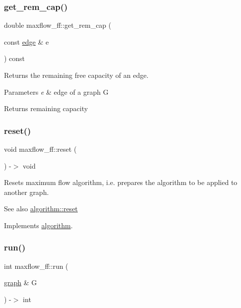 \subsubsection{\texorpdfstring{get\+\_\+rem\+\_\+cap()}{get\_rem\_cap()}}
{\footnotesize\ttfamily double maxflow\+\_\+ff\+::get\+\_\+rem\+\_\+cap (\begin{DoxyParamCaption}\item[{const \mbox{\hyperlink{classedge}{edge}} \&}]{e }\end{DoxyParamCaption}) const}

Returns the remaining free capacity of an edge.


\begin{DoxyParams}{Parameters}
{\em e} & edge of a graph G \\
\hline
\end{DoxyParams}
\begin{DoxyReturn}{Returns}
remaining capacity 
\end{DoxyReturn}
\mbox{\label{classmaxflow__ff_ab9fcde7ee97a160c2be797d35c2a3204}} 
\subsubsection{\texorpdfstring{reset()}{reset()}}
{\footnotesize\ttfamily void maxflow\+\_\+ff\+::reset (\begin{DoxyParamCaption}{ }\end{DoxyParamCaption}) -\/$>$ void\hspace{0.3cm}{\ttfamily [virtual]}}

Resets maximum flow algorithm, i.\+e. prepares the algorithm to be applied to another graph.

\begin{DoxySeeAlso}{See also}
\mbox{\hyperlink{classalgorithm_aea645f2e39976a477c8f8564656fd1b6}{algorithm\+::reset}} 
\end{DoxySeeAlso}


Implements \mbox{\hyperlink{classalgorithm_aea645f2e39976a477c8f8564656fd1b6}{algorithm}}.

\mbox{\label{classmaxflow__ff_a0060613409391c3a6d7e6fe473af21f1}} 
\subsubsection{\texorpdfstring{run()}{run()}}
{\footnotesize\ttfamily int maxflow\+\_\+ff\+::run (\begin{DoxyParamCaption}\item[{\mbox{\hyperlink{classgraph}{graph}} \&}]{G }\end{DoxyParamCaption}) -\/$>$ int\hspace{0.3cm}{\ttfamily [virtual]}}

